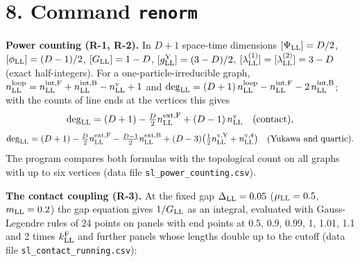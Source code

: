 \documentclass[
  10pt,
]{article}
\begin{document}
\hypertarget{command-renorm}{%
\section{\texorpdfstring{8. Command
\texttt{renorm}}{8. Command renorm}}\label{command-renorm}}

\textbf{Power counting (R-1, R-2).} In \(D+1\) space-time dimensions
\([\Psi_{\rm LL}]=D/2\), \([\phi_{\rm LL}]=(D-1)/2\),
\([G_{\rm LL}]=1-D\), \([g^{\rm Y}_{\rm LL}]=(3-D)/2\),
\([\lambda^{(1)}_{\rm LL}]=[\lambda^{(2)}_{\rm LL}]=3-D\) (exact
half-integers). For a one-particle-irreducible graph,
\(n^{\rm loop}_{\rm LL}=n^{\rm int,F}_{\rm LL}+n^{\rm int,B}_{\rm LL}-n^{\rm v}_{\rm LL}+1\)
and
\(\deg_{\rm LL}=(D+1)\,n^{\rm loop}_{\rm LL}-n^{\rm int,F}_{\rm LL}-2\,n^{\rm int,B}_{\rm LL}\);
with the counts of line ends at the vertices this gives
\[\deg_{\rm LL}=(D+1)-\tfrac D2n^{\rm ext,F}_{\rm LL}+(D-1)\,n^{\rm v}_{\rm LL}\quad\text{(contact)},\]
\[\deg_{\rm LL}=(D+1)-\tfrac D2n^{\rm ext,F}_{\rm LL}-\tfrac{D-1}2n^{\rm ext,B}_{\rm LL}+(D-3)\big(\tfrac12n^{\rm v,Y}_{\rm LL}+n^{\rm v,4}_{\rm LL}\big)\quad\text{(Yukawa and quartic)}.\]
The program compares both formulas with the topological count on all
graphs with up to six vertices (data file
\texttt{sl\_power\_counting.csv}).

\textbf{The contact coupling (R-3).} At the fixed gap
\(\Delta_{\rm LL}=0.05\) (\(\mu_{\rm LL}=0.5\), \(m_{\rm LL}=0.2\)) the
gap equation gives \(1/G_{\rm LL}\) as an integral, evaluated with
Gauss-Legendre rules of 24 points on panels with end points at 0.5, 0.9,
0.99, 1, 1.01, 1.1 and 2 times \(k^{\rm F}_{\rm LL}\) and further panels
whose lengths double up to the cutoff (data file
\texttt{sl\_contact\_running.csv}):
\end{document}
